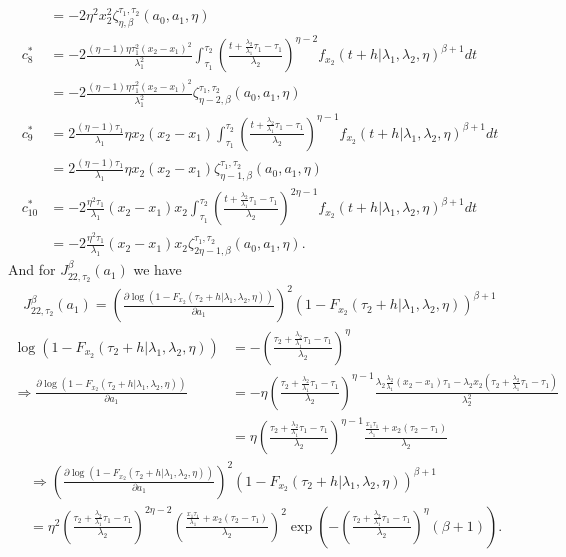 \documentclass{article}
\begin{document}
\begin{align*}
	\\
	&=-2\eta^2 x_2^2 \zeta_{\eta,\beta}^{\tau_1,\tau_2}(a_0,a_1,\eta)
\\
c_8^*&=-2\frac{(\eta-1) \eta\tau_1^2(x_2-x_1)^2}{\lambda_1^2}\int_{\tau_1}^{\tau_2} \left(\frac{t+\frac{\lambda_2}{\lambda_1}\tau_1-\tau_1}{\lambda_2}\right)^{\eta-2} f_{x_2}(t+h|\lambda_1,\lambda_2,\eta)^{\beta+1}dt
	\\
	&=-2\frac{(\eta-1) \eta\tau_1^2(x_2-x_1)^2}{\lambda_1^2} \zeta_{\eta-2,\beta}^{\tau_1,\tau_2}(a_0,a_1,\eta)
\\
c_9^*&=2\frac{(\eta-1)\tau_1}{\lambda_1}\eta x_2 (x_2-x_1)\int_{\tau_1}^{\tau_2} \left(\frac{t+\frac{\lambda_2}{\lambda_1}\tau_1-\tau_1}{\lambda_2}\right)^{\eta-1} f_{x_2}(t+h|\lambda_1,\lambda_2,\eta)^{\beta+1}dt
	\\
	&=2\frac{(\eta-1)\tau_1}{\lambda_1}\eta x_2 (x_2-x_1) \zeta_{\eta-1,\beta}^{\tau_1,\tau_2}(a_0,a_1,\eta)
\\
c_{10}^*&=-2\frac{\eta^2\tau_1}{\lambda_1}(x_2-x_1)x_2\int_{\tau_1}^{\tau_2} \left(\frac{t+\frac{\lambda_2}{\lambda_1}\tau_1-\tau_1}{\lambda_2}\right)^{2\eta-1} f_{x_2}(t+h|\lambda_1,\lambda_2,\eta)^{\beta+1}dt
	\\
	&=-2\frac{\eta^2\tau_1}{\lambda_1}(x_2-x_1)x_2 \zeta_{2\eta-1,\beta}^{\tau_1,\tau_2}(a_0,a_1,\eta).
\end{align*}
And for $J_{22,\tau_2}^{\beta}(a_1)$ we have
\begin{align*}
J_{22,\tau_2}^{\beta}(a_1)=\left(\frac{\partial \log\left(1-F_{x_2}(\tau_2+h|\lambda_1,\lambda_2,\eta)\right)}{\partial a_1}\right)^{2} \left(1-F_{x_2}(\tau_2+h|\lambda_1,\lambda_2,\eta)\right)^{\beta+1}
\end{align*}
\begin{align}
\log\left(1-F_{x_2}(\tau_2+h|\lambda_1,\lambda_2,\eta)\right)&=-\left(\frac{\tau_2+\frac{\lambda_2}{\lambda_1}\tau_1-\tau_1}{\lambda_2}\right)^{\eta} \nonumber
\\
\Rightarrow \frac{\partial \log\left(1-F_{x_2}(\tau_2+h|\lambda_1,\lambda_2,\eta)\right)}{\partial a_1}&=-\eta\left(\frac{\tau_2+\frac{\lambda_2}{\lambda_1}\tau_1-\tau_1}{\lambda_2}\right)^{\eta-1} \frac{\lambda_2\frac{\lambda_2}{\lambda_1}(x_2-x_1)\tau_1-\lambda_2x_2\left(\tau_2+\frac{\lambda_2}{\lambda_1}\tau_1-\tau_1\right)}{\lambda_2^2}  \nonumber
\\
&=\eta\left(\frac{\tau_2+\frac{\lambda_2}{\lambda_1}\tau_1-\tau_1}{\lambda_2}\right)^{\eta-1}\frac{\frac{x_1\tau_1}{\lambda_1}+x_2(\tau_2-\tau_1)}{\lambda_2}
 \label{eq:dev_F2_a1}
\end{align}
\begin{align*}
&\Rightarrow \left(\frac{\partial \log\left(1-F_{x_2}(\tau_2+h|\lambda_1,\lambda_2,\eta)\right)}{\partial a_1}\right)^2 \left(1-F_{x_2}(\tau_2+h|\lambda_1,\lambda_2,\eta)\right)^{\beta+1}
\\
&=\eta^2\left(\frac{\tau_2+\frac{\lambda_2}{\lambda_1}\tau_1-\tau_1}{\lambda_2}\right)^{2\eta-2}\left(\frac{\frac{x_1\tau_1}{\lambda_1}+x_2(\tau_2-\tau_1)}{\lambda_2}\right)^2\exp\left(-\left(\frac{\tau_2+\frac{\lambda_2}{\lambda_1}\tau_1-\tau_1}{\lambda_2}\right)^{\eta}(\beta+1)\right).
\end{align*}
\end{document}
